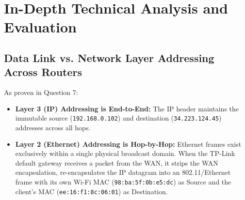 \documentclass[11pt,a4paper]{article}
\begin{document}
\begin{table}[H]
\centering
\caption{Chronological Time-Sequence Flow Ladder Events}
\label{tab:flow_events}
\end{table}

\section{In-Depth Technical Analysis and Evaluation}

\subsection{Data Link vs. Network Layer Addressing Across Routers}
As proven in Question 7:
\begin{itemize}[leftmargin=*]
    \item \textbf{Layer 3 (IP) Addressing is End-to-End:} The IP header maintains the immutable source (\texttt{192.168.0.102}) and destination (\texttt{34.223.124.45}) addresses across all hops.
    \item \textbf{Layer 2 (Ethernet) Addressing is Hop-by-Hop:} Ethernet frames exist exclusively within a single physical broadcast domain. When the TP-Link default gateway receives a packet from the WAN, it strips the WAN encapsulation, re-encapsulates the IP datagram into an 802.11/Ethernet frame with its own Wi-Fi MAC (\texttt{98:ba:5f:0b:e5:dc}) as Source and the client's MAC (\texttt{ee:16:f1:8c:06:01}) as Destination.
\end{itemize}
\end{document}
